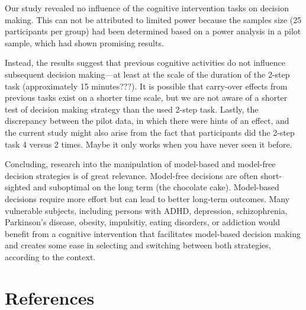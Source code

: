 \documentclass[11pt]{article} %
\begin{document}
Our study revealed no influence of the cognitive intervention tasks on decision making. This can not be attributed to limited power because the samples size (25 participants per group) had been determined based on a power analysis in a pilot sample, which had shown promising results. 

Instead, the results suggest that previous cognitive activities do not influence subsequent decision making---at least at the scale of the duration of the 2-step task (approximately 15 minutes???). It is possible that carry-over effects from previous tasks exist on a shorter time scale, but we are not aware of a shorter test of decision making strategy than the used 2-step task. Lastly, the discrepancy between the pilot data, in which there were hints of an effect, and the current study might also arise from the fact that participants did the 2-step task 4 versus 2 times. Maybe it only works when you have never seen it before.

Concluding, research into the manipulation of model-based and model-free decision strategies is of great relevance. Model-free decisions are often short-sighted and suboptimal on the long term (the chocolate cake). Model-based decisions require more effort but can lead to better long-term outcomes. Many vulnerable subjects, including persons with ADHD, depression, schizophrenia, Parkinson's disease, obesity, impulsitiy, eating disorders, or addiction would benefit from a cognitive intervention that facilitates model-based decision making and creates some ease in selecting and switching between both strategies, according to the context.

\section{References}
\end{document}
